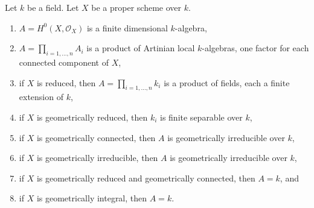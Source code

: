 \begin{lemma}
\label{lemma-proper-geometrically-reduced-global-sections}
Let $k$ be a field. Let $X$ be a proper scheme over $k$.
\begin{enumerate}
\item $A = H^0(X, \mathcal{O}_X)$ is a finite dimensional $k$-algebra,
\item $A = \prod_{i = 1, \ldots, n} A_i$ is a product of Artinian
local $k$-algebras, one factor for each connected component of $X$,
\item if $X$ is reduced, then $A = \prod_{i = 1, \ldots, n} k_i$
is a product of fields, each a finite extension of $k$,
\item if $X$ is geometrically reduced, then $k_i$ is finite separable
over $k$,
\item if $X$ is geometrically connected, then $A$ is geometrically
irreducible over $k$,
\item if $X$ is geometrically irreducible, then $A$ is geometrically
irreducible over $k$,
\item if $X$ is geometrically reduced and geometrically connected, then
$A = k$, and
\item if $X$ is geometrically integral, then $A = k$.
\end{enumerate}
\end{lemma}

